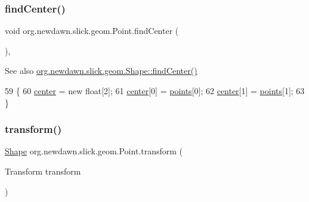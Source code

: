 \subsubsection{\texorpdfstring{find\+Center()}{findCenter()}}
{\footnotesize\ttfamily void org.\+newdawn.\+slick.\+geom.\+Point.\+find\+Center (\begin{DoxyParamCaption}{ }\end{DoxyParamCaption})\hspace{0.3cm}{\ttfamily [inline]}, {\ttfamily [protected]}}

\begin{DoxySeeAlso}{See also}
\mbox{\hyperlink{classorg_1_1newdawn_1_1slick_1_1geom_1_1_shape_ac90548bc552524c42ca2daad8e1ba692}{org.\+newdawn.\+slick.\+geom.\+Shape\+::find\+Center()}} 
\end{DoxySeeAlso}

\begin{DoxyCode}
59     \{ 
60         \mbox{\hyperlink{classorg_1_1newdawn_1_1slick_1_1geom_1_1_shape_a15ecde3336c4310cd927d766bb9a0b3b}{center}} = \textcolor{keyword}{new} \textcolor{keywordtype}{float}[2];
61         \mbox{\hyperlink{classorg_1_1newdawn_1_1slick_1_1geom_1_1_shape_a15ecde3336c4310cd927d766bb9a0b3b}{center}}[0] = \mbox{\hyperlink{classorg_1_1newdawn_1_1slick_1_1geom_1_1_shape_a8b4d4058734bbb3b96072e470b92aa37}{points}}[0]; 
62         \mbox{\hyperlink{classorg_1_1newdawn_1_1slick_1_1geom_1_1_shape_a15ecde3336c4310cd927d766bb9a0b3b}{center}}[1] = \mbox{\hyperlink{classorg_1_1newdawn_1_1slick_1_1geom_1_1_shape_a8b4d4058734bbb3b96072e470b92aa37}{points}}[1]; 
63     \} 
\end{DoxyCode}
\mbox{\label{classorg_1_1newdawn_1_1slick_1_1geom_1_1_point_a9c3bead7f43bac5c80d377c08d7829f0}} 
\subsubsection{\texorpdfstring{transform()}{transform()}}
{\footnotesize\ttfamily \mbox{\hyperlink{classorg_1_1newdawn_1_1slick_1_1geom_1_1_shape}{Shape}} org.\+newdawn.\+slick.\+geom.\+Point.\+transform (\begin{DoxyParamCaption}\item[{Transform}]{transform }\end{DoxyParamCaption})\hspace{0.3cm}{\ttfamily [inline]}}

